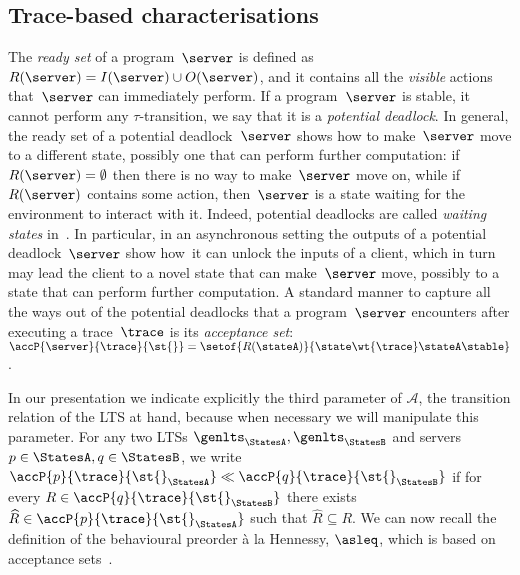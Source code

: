 \subsection{Trace-based characterisations} 
The {\em ready set} of a program~$\server$ is defined as
 $R( \server ) = I( \server ) \cup O( \server )$,
and it contains all the {\em visible} actions that~$\server$ can
immediately
perform.  If a program~$\server$ is
stable, \ie it cannot perform any
$\tau$-transition, we say that it is a {\em potential
  deadlock}.  In general, the ready set of a potential
deadlock~$\server$ shows how to make~$\server$ move to a different
state, possibly one that can perform further computation: if
$R( \server ) = \emptyset$ then there is no way to make~$\server$ move
on, while if~$R( \server )$ contains some action, then~$\server$ is
a state waiting for the environment to interact with it.
Indeed, potential deadlocks are called {\em waiting states}
in~\cite{DBLP:conf/ecoop/HondaT91}.
In particular, in an asynchronous setting the outputs of a
potential deadlock~$\server$ show how~it %
can unlock the inputs
of a client, which in turn may lead the client to a novel state that
can make~$\server$ move, possibly to a state that can perform further
computation.
A standard manner to capture all the ways out of the potential
deadlocks that a program~$\server$ encounters after executing a
trace~$\trace$ is its {\em acceptance set}:
$\accP{ \server }{ \trace }{ \st{} } = \setof{ R( \stateA ) }{ \state \wt{ \trace } \stateA \stable }$.

In our presentation we indicate explicitly the third parameter of
$\mathcal{A}$, \ie the transition relation of the LTS at hand, because
when necessary we will manipulate this parameter.
For any two LTSs $\genlts_\StatesA, \genlts_\StatesB$ and servers
  $ \serverA \in \StatesA, \serverB \in \StatesB$, we 
  write $\accP{ \serverA }{ \trace }{\st{}_\StatesA} \ll \accP{
    \serverB }{ \trace }{ \st{}_\StatesB}$ %
  if for every $R \in \accP{
    \serverB }{ \trace }{ \st{}_\StatesB}$
there exists $\widehat{R} \in \accP{ \serverA }{ \trace }{\st{}_\StatesA}$
such that $\widehat{R}
  \subseteq R$.
  We can now recall the definition of the behavioural preorder à la
  Hennessy, $\asleq$, which is based on acceptance
  sets~\cite{DBLP:books/daglib/0066919}.

